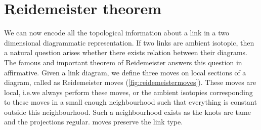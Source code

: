 \section{Reidemeister theorem}

We can now encode all the topological information about a link in a two dimensional diagrammatic representation. If two links are ambient isotopic, then a natural question arises whether there exists relation between their diagrams. The famous and important theorem of Reidemeister answers this question in affirmative. Given a link diagram, we define three moves on local sections of a diagram, called as Reidemeister moves (\cref{fig:reidemeistermoves}). These moves are local, i.e.\@ we always perform these moves, or the ambient isotopies corresponding to these moves in a small enough neighbourhood such that everything is constant outside this neighbourhood. Such a neighbourhood exists as the knots are tame and the projections regular. moves preserve the link type.

